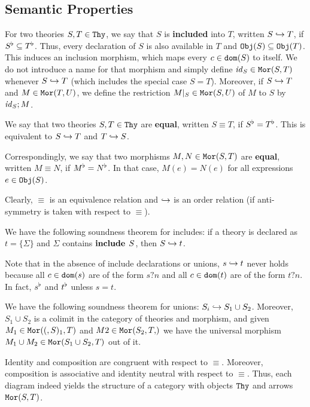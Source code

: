 \begin{modexp}
\subsection{Semantic Properties}

For two theories $S,T\in\mathtt{Thy}$, we say that $S$ is \textbf{included} into $T$, written $S\hookrightarrow T$, if $S^\flat\subseteq T^\flat$.
Thus, every declaration of $S$ is also available in $T$ and $\mathtt{Obj}(S)\subseteq\mathtt{Obj}(T)$.
This induces an inclusion morphism, which maps every $c\in\mathtt{dom}(S)$ to itself.
We do not introduce a name for that morphism and simply define $\mathit{id}_{S}\in\mathtt{Mor}(S,T)$ whenever $S\hookrightarrow T$ (which includes the special case $S=T$).
Moreover, if $S\hookrightarrow T$ and $M\in\mathtt{Mor}(T,U)$, we define the restriction $M|_S\in\mathtt{Mor}(S,U)$ of $M$ to $S$ by $\mathit{id}_{S};M$.

We say that two theories $S,T\in\mathtt{Thy}$ are \textbf{equal}, written $S\equiv T$, if $S^\flat=T^\flat$.
This is equivalent to $S\hookrightarrow T$ and $T\hookrightarrow S$.

Correspondingly, we say that two morphisms $M,N\in\mathtt{Mor}(S,T)$ are \textbf{equal}, written $M\equiv N$, if $M^\flat=N^\flat$.
In that case, $M(e)=N(e)$ for all expressions $e\in\mathtt{Obj}(S)$.

Clearly, $\equiv$ is an equivalence relation and $\hookrightarrow$ is an order relation (if anti-symmetry is taken with respect to $\equiv$).

\begin{example}\label{rel:incl}
We have the following soundness theorem for includes: if a theory is declared as $t=\{\Sigma\}$ and $\Sigma$ contains $\operatorname{\mathbf{include}}{\;S}$, then $S\hookrightarrow t$.

Note that in the absence of include declarations or unions, $s\hookrightarrow t$ never holds because all $c\in\mathtt{dom}(s)$ are of the form $s?n$ and all $c\in\mathtt{dom}(t)$ are of the form $t?n$.
In fact, $s^\flat$ and $t^\flat$ unless $s=t$.
\end{example}

\begin{union}
\begin{example}\label{rel:union}
We have the following soundness theorem for unions: $S_i\hookrightarrow S_1\cup S_2$.
Moreover, $S_1\cup S_2$ is a colimit in the category of theories and morphism, and given $M_1\in\mathtt{Mor}((,S)_1,T)$ and $M2\in\Mo{S_2,T}$ we have the universal morphism $M_1\cup M_2\in\mathtt{Mor}(S_1\cup S_2,T)$ out of it.
\end{example}
\end{union}

\begin{example}\label{rel:cat}
Identity and composition are congruent with respect to $\equiv$.
Moreover, composition is associative and identity neutral with respect to $\equiv$.
Thus, each diagram indeed yields the structure of a category with objects $\mathtt{Thy}$ and arrows $\mathtt{Mor}(S,T)$.
\end{example}
\end{modexp}